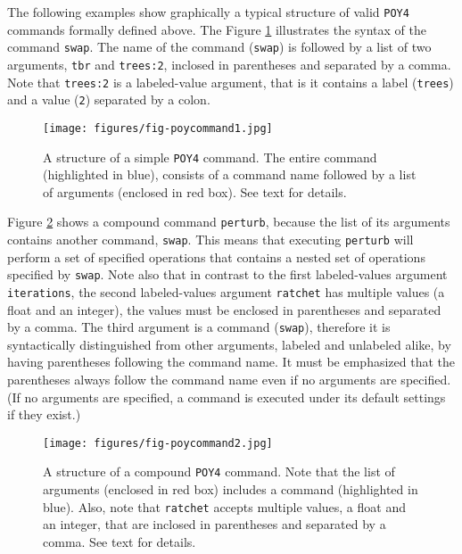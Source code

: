 \documentclass[11pt]{book}
\newcommand{\commandstyle}[1]{\texttt{#1}}
\newcommand{\poycommand}[1]{\commandstyle{#1}}
\newcommand{\poyargument}[1]{\commandstyle{#1}}
\newcommand{\poy}{\commandstyle{POY4}\xspace}
\begin{document}
The following examples show graphically a typical structure of valid \poy commands
formally defined above. The Figure \ref{simplecommand} illustrates
the syntax of the command \poycommand{swap}. The name of the
command (\poycommand{swap}) is followed by a list of two arguments,
\poyargument{tbr} and \poyargument{trees:2}, inclosed in parentheses
and separated by a comma. Note that \poyargument{trees:2} is a labeled-value
argument, that is it contains a label (\texttt{trees}) and a value (\texttt{2})
separated by a colon.

\begin{figure}[htbp]
   \centering
   \texttt{[image: figures/fig-poycommand1.jpg]}
   \caption{A structure of a simple \poy command. The entire command (highlighted
   in blue), consists of  a command name followed by a list of arguments (enclosed in red box).
   See text for details.}
   \label{simplecommand}
\end{figure}

Figure \ref{compositecommand} shows a compound command \poycommand{perturb}, because the list of its arguments contains another command, \poycommand{swap}. This means
that executing \poycommand{perturb} will perform a set of specified operations that contains
a nested set of operations specified by \poycommand{swap}. Note also that in contrast to the first labeled-values argument \poyargument{iterations}, the second labeled-values argument \poyargument{ratchet} has multiple values (a float and an integer), the values must be enclosed in parentheses and separated by a comma. The third argument is a command (\poycommand{swap}), therefore it is syntactically distinguished from other arguments, labeled and unlabeled alike, by having
parentheses following the command name. It must be emphasized that the parentheses always follow
the command name even if no arguments are specified. (If no arguments are specified, a command is executed under its default settings if they exist.)

\begin{figure}[htbp]
   \centering
   \texttt{[image: figures/fig-poycommand2.jpg]}
   \caption{A structure of a compound \poy command. Note that the list of arguments
   (enclosed in red box) includes a command (highlighted in blue). Also, note that
   \poyargument{ratchet} accepts multiple values, a float and an integer, that are inclosed in
   parentheses and separated by a comma. See text for details.}
   \label{compositecommand}
\end{figure}
\end{document}
